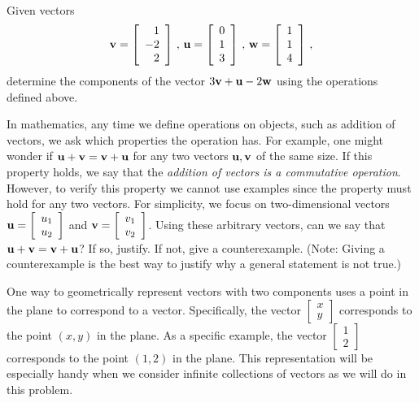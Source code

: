 \begin{pa} \label{pa:1_d} ~
\be 
\item Given vectors
\[ \mathbf{v} =\left[ \begin{array}{r} 1 \\ -2 \\ 2 \end{array} \right] \, , \, \mathbf{u}=\left[ \begin{array}{c} 0 \\ 1\\ 3 \end{array} \right] \, , \, \mathbf{w}= \left[ \begin{array}{c} 1\\ 1\\ 4 \end{array} \right]\, , \]
determine the components of the vector $3\mathbf{v} + \mathbf{u} - 2\mathbf{w}$ using the operations defined above.


\item In mathematics, any time we define operations on objects, such as addition of vectors, we ask which properties the operation has. For example, one might wonder if $\mathbf{u}+\mathbf{v}=\mathbf{v}+\mathbf{u}$ for any two vectors $\mathbf{u}, \mathbf{v}$ of the same size. If this property holds, we say that the \emph{addition of vectors is a commutative operation}. However, to verify this property we cannot use examples since the property must hold for any two vectors. For simplicity, we focus on two-dimensional vectors $\mathbf{u} = \left[ \begin{array}{c} u_1\\ u_2\end{array} \right]$ and $\mathbf{v} = \left[ \begin{array}{c} v_1\\ v_2\end{array} \right]$. Using these arbitrary vectors, can we say that $\mathbf{u}+\mathbf{v}=\mathbf{v}+\mathbf{u}$? If so, justify. If not, give a counterexample. (Note: Giving a counterexample is the best way to justify why a general statement is not true.)


		

\item One way to geometrically represent vectors with two components uses a point in the plane to correspond to a vector. Specifically, the vector $\left[ \begin{array}{c} x \\ y \end{array} \right]$ corresponds to the point $(x, y)$ in the plane. As a specific example, the vector $\left[ \begin{array}{c} 1 \\ 2 \end{array} \right]$ corresponds to the point $(1, 2)$ in the plane. This representation will be especially handy when we consider infinite collections of vectors as we will do in this problem.


\end{pa}
